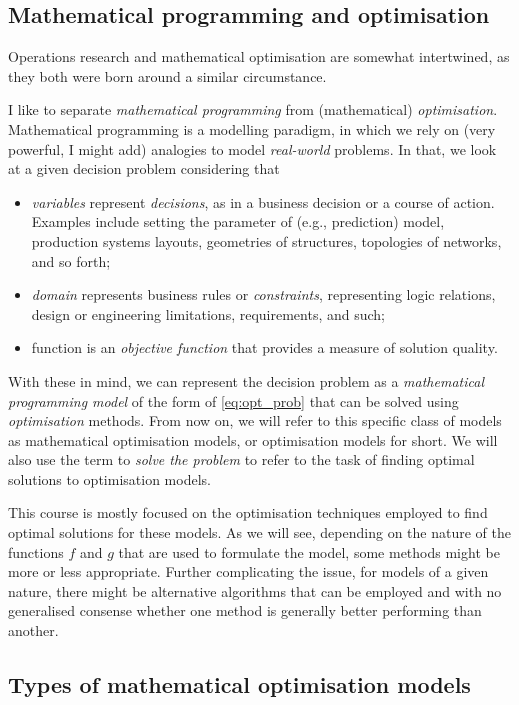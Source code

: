\documentclass{article}
\begin{document}
\subsection{Mathematical programming and optimisation}

Operations research and mathematical optimisation are somewhat intertwined, as they both were born around a similar circumstance. %

I like to separate \emph{mathematical programming} from (mathematical) \emph{optimisation}. Mathematical programming is a modelling paradigm, in which we rely on (very powerful, I might add) analogies to model \emph{real-world} problems. In that, we look at a given decision problem considering that
%
\begin{itemize}
    \item \emph{variables} represent \emph{decisions}, as in a business decision or a course of action. Examples include setting the parameter of (e.g., prediction) model, production systems layouts, geometries of structures, topologies of networks, and so forth; 
    \item \emph{domain} represents business rules or \emph{constraints}, representing logic relations, design or engineering limitations, requirements, and such; 
    \item function is an \emph{objective function} that provides a measure of solution quality.  
\end{itemize}
%    
With these in mind, we can represent the decision problem as a \emph{mathematical programming model} of the form of \eqref{eq:opt_prob} that can be solved using \emph{optimisation} methods. From now on, we will refer to this specific class of models as mathematical optimisation models, or optimisation models for short. We will also use the term to \emph{solve the problem} to refer to the task of finding optimal solutions to optimisation models.

This course is mostly focused on the optimisation techniques employed to find optimal solutions for these models. As we will see, depending on the nature of the functions $f$ and $g$ that are used to formulate the model, some methods might be more or less appropriate. Further complicating the issue, for models of a given nature, there might be alternative algorithms that can be employed and with no generalised consense whether one method is generally better performing than another. 


\subsection{Types of mathematical optimisation models}
\end{document}
